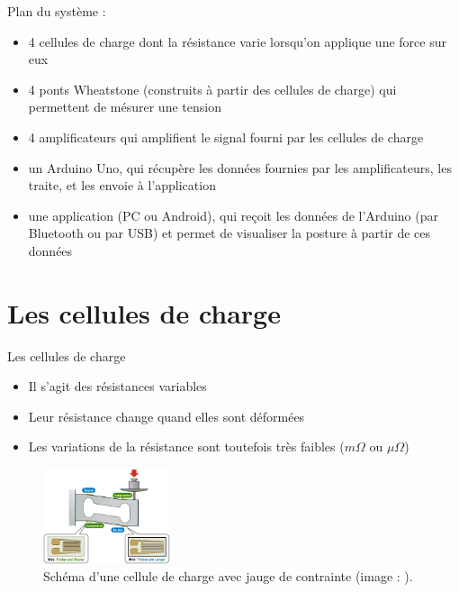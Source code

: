 \documentclass{beamer}
\begin{document}
\begin{frame}
\begin{block}{Plan du système :}
\pause
\begin{itemize}
\item 4 cellules de charge dont la résistance varie lorsqu'on applique une force sur eux
\pause
\item 4 ponts Wheatstone (construits à partir des cellules de charge) qui permettent de mésurer une tension
\pause
\item 4 amplificateurs qui amplifient le signal fourni par les cellules de charge
\pause
\item un Arduino Uno, qui récupère les données fournies par les amplificateurs, les traite, et les envoie à l'application
\pause
\item une application (PC ou Android), qui reçoit les données de l'Arduino (par Bluetooth ou par USB) et permet de visualiser la posture à partir de ces données
\end{itemize}
\end{block}
\end{frame}

\section{Les cellules de charge}
\begin{frame}
\begin{block}{Les cellules de charge}
\pause
\begin{itemize}
\item Il s'agit des résistances variables
\pause
\item Leur résistance change quand elles sont déformées
\pause
\item Les variations de la résistance sont toutefois très faibles ($m\Omega$ ou $\mu\Omega$)
\end{itemize}
\pause
\begin{figure}
\begin{center}
\includegraphics[height=2.8cm]{images/load_cell.jpg}
\end{center}
\caption{Schéma d'une cellule de charge avec jauge de contrainte (image : \cite{sparkfun}).}
\label{fig:load_cell_sparkfun}
\end{figure}
\end{block}
\end{frame}
\end{document}
